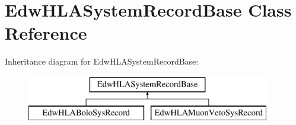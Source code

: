 \hypertarget{class_edw_h_l_a_system_record_base}{
\section{EdwHLASystemRecordBase Class Reference}
\label{class_edw_h_l_a_system_record_base}
}
Inheritance diagram for EdwHLASystemRecordBase:\begin{figure}[H]
\begin{center}
\leavevmode
\includegraphics[height=2cm]{class_edw_h_l_a_system_record_base}
\end{center}
\end{figure}
